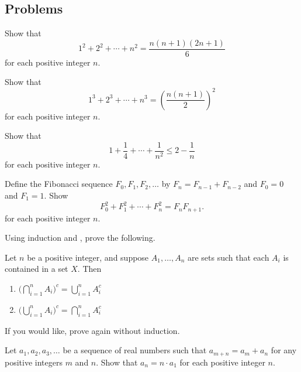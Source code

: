 \documentclass[../main.tex]{subfiles}
\begin{document}
\subsection{Problems}
\begin{homework}
    Show that
    \[1^2+2^2+\cdots +n^2=\frac{n(n+1)(2n+1)}{6}\]
    for each positive integer $n$.
\end{homework}
\begin{homework}
    Show that
    \[1^3+2^3+\cdots+n^3=\left(\frac{n(n+1)}2\right)^2\]
    for each positive integer $n$.
\end{homework}
\begin{homework} \label{hw:basel}
    Show that $$1+\frac{1}{4}+\cdots +\frac{1}{n^2} \le 2-\frac{1}{n}$$ for each positive integer $n$.
\end{homework}
\begin{homework} \label{hw:fib}
    Define the Fibonacci sequence $F_0,F_1,F_2,\ldots$ by $F_n=F_{n-1}+F_{n-2}$ and $F_0=0$ and $F_1=1$. Show
    \[F_0^2+F_1^2+\cdots+F_n^2=F_nF_{n+1}.\]
    for each positive integer $n$.
\end{homework}
\begin{homework}
    Using induction and , prove the following.
    \begin{theorem} \label{thm:general-de-morgan}
        Let $n$ be a positive integer, and suppose $A_1, \dots, A_n$ are sets such that each $A_i$ is contained in a set $X$. Then
        \begin{enumerate}[label=(\alph*)]
            \item $\Big(\bigcap_{i = 1}^nA_i\Big)^c = \bigcup_{i = 1}^n A_i^c$
            \item $\Big(\bigcup_{i = 1}^nA_i\Big)^c = \bigcap_{i = 1}^n A_i^c$
        \end{enumerate}
    \end{theorem}
    If you would like, prove  again without induction.
\end{homework}
\begin{homework}
    Let $a_1,a_2,a_3,\ldots$ be a sequence of real numbers such that $a_{m+n}=a_m+a_n$ for any positive integers $m$ and $n$. Show that $a_n=n\cdot a_1$ for each positive integer $n$.
\end{homework}
\end{document}
